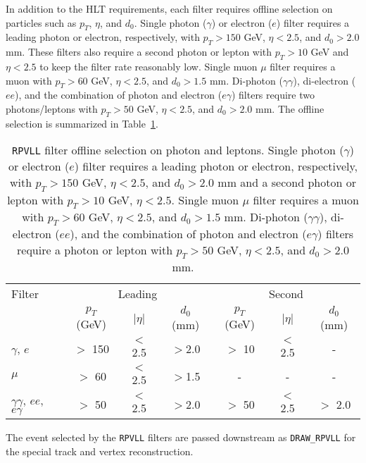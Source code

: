 In addition to the HLT requirements, each filter requires offline selection on particles such as $p_{T}$, $\eta$, and $d_{0}$. Single photon ($\gamma$) or electron ($e$) filter requires a leading photon or electron, respectively, with $p_{T} > 150$ GeV, $\eta < 2.5$, and $d_{0} > 2.0$ mm. These filters also require a second photon or lepton with $p_{T} > 10$ GeV and $\eta < 2.5$ to keep the filter rate reasonably low. Single muon $\mu$ filter requires a muon with $p_{T} > 60$ GeV, $\eta < 2.5$, and $d_{0} > 1.5$ mm. Di-photon ($\gamma\gamma$), di-electron ($ee$), and the combination of photon and electron ($e\gamma$) filters require two photons/leptons with $p_{T} > 50$ GeV, $\eta < 2.5$, and $d_{0} > 2.0$ mm. The offline selection is summarized in Table~\ref{table:rpvll_filter_selection}.

\begin{table}[!htb]
  \centering
  \begin{tabular}{l c c c | c c c}
    \hline
    \hline
    Filter          & \multicolumn{3}{c|}{Leading}  &  \multicolumn{3}{c}{Second} \\
                    & $p_{T}$ (GeV) & $|\eta|$    & $d_{0}$ (mm) & $p_{T}$ (GeV) & $|\eta|$    & $d_{0}$ (mm)  \\
    \hline
    $\gamma$, $e$                   & $>$ 150   & $<$2.5  & $>$2.0  & $>$ 10 & $<$2.5 & -       \\
    $\mu$                           & $>$ 60    & $<$2.5  & $>$1.5  & -      & -      & -       \\
    $\gamma\gamma$, $ee$, $e\gamma$ & $>$ 50    & $<$2.5  & $>$2.0  & $>$ 50 & $<$2.5 & $>$ 2.0 \\
    \hline
    \hline
  \end{tabular}
  \caption{\texttt{RPVLL} filter offline selection on photon and leptons. Single photon ($\gamma$) or electron ($e$) filter requires a leading photon or electron, respectively, with $p_{T} > 150$ GeV, $\eta < 2.5$, and $d_{0} > 2.0$ mm and a second photon or lepton with $p_{T} > 10$ GeV, $\eta < 2.5$. Single muon $\mu$ filter requires a muon with $p_{T} > 60$ GeV, $\eta < 2.5$, and $d_{0} > 1.5$ mm. Di-photon ($\gamma\gamma$), di-electron ($ee$), and the combination of photon and electron ($e\gamma$) filters require a photon or lepton with $p_{T} > 50$ GeV, $\eta < 2.5$, and $d_{0} > 2.0$ mm.}
  \label{table:rpvll_filter_selection}
\end{table}

The event selected by the \texttt{RPVLL} filters are passed downstream as \texttt{DRAW\_RPVLL} for the special track and vertex reconstruction.

